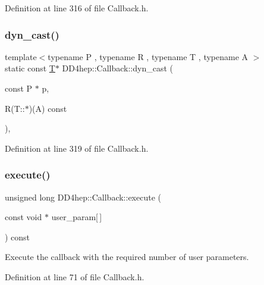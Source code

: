 Definition at line 316 of file Callback.\+h.

\hypertarget{class_d_d4hep_1_1_callback_a3e2e1256e6dadd456674144094b0de85}{}\label{class_d_d4hep_1_1_callback_a3e2e1256e6dadd456674144094b0de85} 
\subsubsection{\texorpdfstring{dyn\+\_\+cast()}{dyn\_cast()}\hspace{0.1cm}{\footnotesize\ttfamily [4/4]}}
{\footnotesize\ttfamily template$<$typename P , typename R , typename T , typename A $>$ \\
static const \hyperlink{class_t}{T}$\ast$ D\+D4hep\+::\+Callback\+::dyn\+\_\+cast (\begin{DoxyParamCaption}\item[{const P $\ast$}]{p,  }\item[{R(T\+::$\ast$)(A)}]{const }\end{DoxyParamCaption})\hspace{0.3cm}{\ttfamily [inline]}, {\ttfamily [static]}}



Definition at line 319 of file Callback.\+h.

\hypertarget{class_d_d4hep_1_1_callback_a899fb435d038824e54e1fbcbb04fa8ef}{}\label{class_d_d4hep_1_1_callback_a899fb435d038824e54e1fbcbb04fa8ef} 
\subsubsection{\texorpdfstring{execute()}{execute()}}
{\footnotesize\ttfamily unsigned long D\+D4hep\+::\+Callback\+::execute (\begin{DoxyParamCaption}\item[{const void $\ast$}]{user\+\_\+param\mbox{[}$\,$\mbox{]} }\end{DoxyParamCaption}) const\hspace{0.3cm}{\ttfamily [inline]}}



Execute the callback with the required number of user parameters. 



Definition at line 71 of file Callback.\+h.



